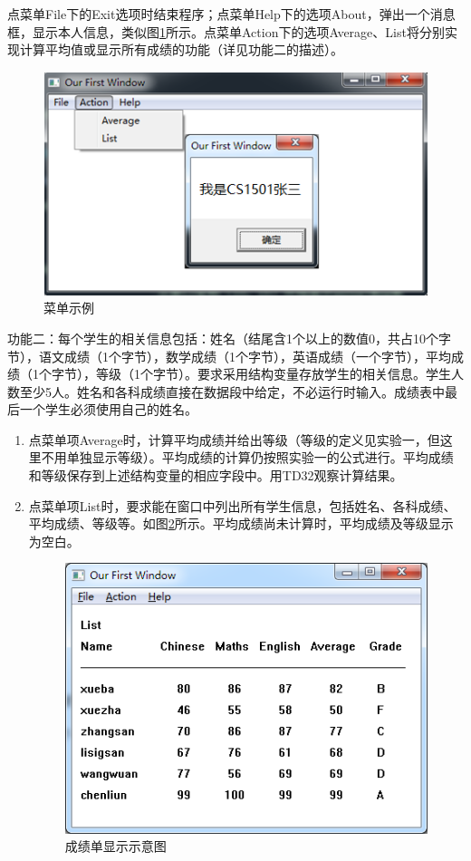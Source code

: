 \documentclass{article}
\begin{document}
	点菜单File下的Exit选项时结束程序；点菜单Help下的选项About，弹出一个消息框，显示本人信息，类似图\ref{fig:example0}所示。点菜单Action下的选项Average、List将分别实现计算平均值或显示所有成绩的功能（详见功能二的描述）。\par
	\begin{figure}[H]
		\centering
		\includegraphics[width=0.7\linewidth]{res/homework_5/example0.png}
		\caption{菜单示例}
		\label{fig:example0}
	\end{figure}
	功能二：每个学生的相关信息包括：姓名（结尾含1个以上的数值0，共占10个字节），语文成绩（1个字节），数学成绩（1个字节），英语成绩（一个字节），平均成绩（1个字节），等级（1个字节）。要求采用结构变量存放学生的相关信息。学生人数至少5人。姓名和各科成绩直接在数据段中给定，不必运行时输入。成绩表中最后一个学生必须使用自己的姓名。\par
	\begin{enumerate}
		\item 点菜单项Average时，计算平均成绩并给出等级（等级的定义见实验一，但这里不用单独显示等级）。平均成绩的计算仍按照实验一的公式进行。平均成绩和等级保存到上述结构变量的相应字段中。用TD32观察计算结果。
		\item 点菜单项List时，要求能在窗口中列出所有学生信息，包括姓名、各科成绩、平均成绩、等级等。如图\ref{fig:example}所示。平均成绩尚未计算时，平均成绩及等级显示为空白。
			\begin{figure}[H]
				\centering
				\includegraphics[width=0.7\linewidth]{res/homework_5/example.png}
				\caption{成绩单显示示意图}
				\label{fig:example}
			\end{figure}
	\end{enumerate}
\end{document}
